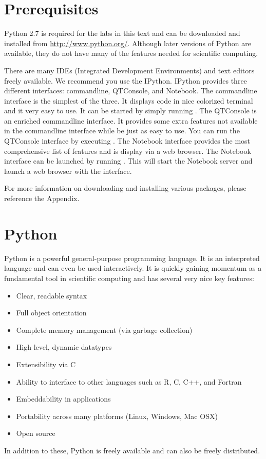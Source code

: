\label{lab:Essential_Python}

\section*{Prerequisites}
Python 2.7 is required for the labs in this text and can be downloaded and 
installed from \url{http://www.python.org/}. Although later versions of 
Python are available, they do not have many of the features needed for scientific computing. 

There are many IDEs (Integrated Development Environments) and text editors freely 
available. We recommend you use the IPython.
IPython provides three different interfaces: commandline, QTConsole, and Notebook.
The commandline interface is the simplest of the three.
It displays code in nice colorized terminal and it very easy to use.
It can be started by simply running .
The QTConsole is an enriched commandline interface.
It provides some extra features not available in the commandline interface while be just as easy to use.
You can run the QTConsole interface by executing .
The Notebook interface provides the most comprehensive list of features and is display via a web browser.
The Notebook interface can be launched by running .
This will start the Notebook server and launch a web browser with the interface.

For more information on downloading and installing various packages, please 
reference the Appendix. 


\section*{Python}
Python is a powerful general-purpose programming language. It is an interpreted
language and can even be used interactively. 
It is quickly gaining momentum as a fundamental tool in scientific computing and has several 
very nice key features:
\begin{itemize}
\item Clear, readable syntax
\item Full object orientation
\item Complete memory management (via garbage collection)
\item High level, dynamic datatypes
\item Extensibility via C
\item Ability to interface to other languages such as R, C, C++, and Fortran
\item Embeddability in applications
\item Portability across many platforms (Linux, Windows, Mac OSX)
\item Open source
\end{itemize}
In addition to these, Python is freely available and can also be freely distributed.

